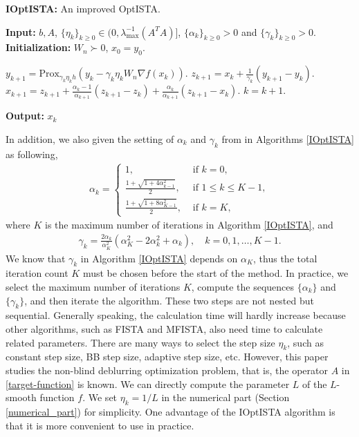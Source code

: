 \documentclass{article}
\begin{document}
\begin{algorithm}[H]
\caption{\textbf{IOptISTA:} An improved OptISTA.}
\label{IOptISTA}
{\bfseries Input:} $b,A$, $\{\eta_{k}\}_{k\ge 0}\in(0,\lambda_{\max}^{-1}(A^{T}A)]$, $\{\alpha_{k}\}_{k\ge0}>0$ and $\{\gamma_{k}\}_{k\ge0}>0$. \\
{\bfseries Initialization:} $W_{n}\succ0$,  $x_{0}=y_{0}$.  
\begin{algorithmic}[1] 
\State $y_{k+1}=\mathrm{Prox}_{\gamma_{k}\eta_{k} h}(y_{k}-\gamma_{k}\eta_{k} W_{n}\nabla f(x_{k}))$.
\State $z_{k+1}=x_{k}+\frac{1}{\gamma_{k}}(y_{k+1}-y_{k})$.
\State $x_{k+1}=z_{k+1}+\frac{\alpha_{k}-1}{\alpha_{k+1}}(z_{k+1}-z_{k})+\frac{\alpha_{k}}{\alpha_{k+1}}(z_{k+1}-x_{k})$.
\State $k=k+1$.
\EndWhile
\end{algorithmic} 
{\bfseries Output:}  $x_{k}$ 
\end{algorithm}
In addition, we also given the setting of $\alpha_{k}$ and $\gamma_{k}$ from \cite{JangGR23} in Algorithms \ref{IOptISTA} as following, 
\begin{eqnarray}
\alpha_{k}=\begin{cases}
	1, &\text{ if } k=0,\\
	\frac{1+\sqrt{1+4\alpha_{k-1}^{2}}}{2}, &\text{ if } 1\le k \le K-1,\\
	\frac{1+\sqrt{1+8\alpha_{K-1}^{2}}}{2}, &\text{ if } k=K,
\end{cases}
\end{eqnarray}
where $K$ is the maximum number of iterations in Algorithm \ref{IOptISTA}, and 
\begin{eqnarray}
\gamma_{k}=\frac{2\alpha_{k}}{\alpha_{K}^{2}}(\alpha_{K}^{2} - 2\alpha_{k}^{2}+\alpha_{k}), \quad k=0,1,\dots,K-1.
\end{eqnarray}
We know that $\gamma_{k}$ in Algorithm \ref{IOptISTA} depends on $\alpha_{K}$, thus the total iteration count $K$ must be chosen before the start of the method. In practice, we select the maximum number of iterations $K$, compute the sequences $\{\alpha_{k}\}$ and $\{\gamma_{k}\}$, and then iterate the algorithm. These two steps are not nested but sequential. Generally speaking, the calculation time will hardly increase because other algorithms, such as FISTA and MFISTA, also need time to calculate related parameters. There are many ways to select the step size $\eta_{k}$, such as constant step size, BB step size, adaptive step size, etc. However, this paper studies the non-blind deblurring optimization problem, that is, the operator $A$ in \eqref{target-function} is known. We can directly compute the parameter $L$ of the $L$-smooth function $f$. We set $\eta_{k}=1/L$ in the numerical part (Section \ref{numerical_part}) for simplicity. One advantage of the IOptISTA algorithm is that it is more convenient to use in practice.
\end{document}
